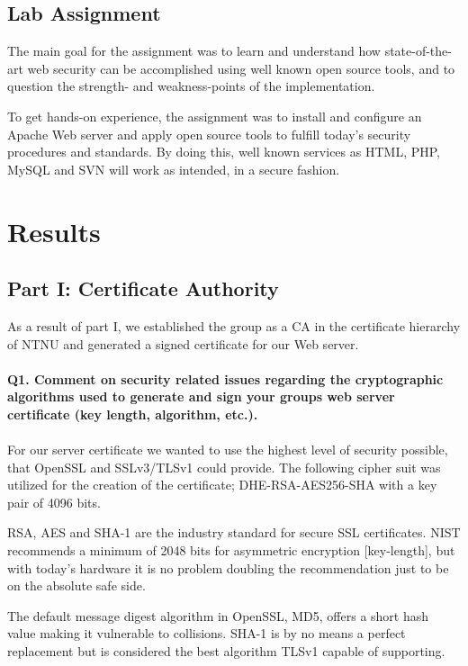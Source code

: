 \documentclass[a4paper, 12pt]{article}
\begin{document}
\subsection{Lab Assignment}
The main goal for the assignment was to learn and understand how state-of-the-art web security can be accomplished using well known open source tools, and to question the strength- and weakness-points of the implementation.

To get hands-on experience, the assignment was to install and configure an Apache Web server and apply open source tools to fulfill today’s security procedures and standards. By doing this, well known services as HTML, PHP, MySQL and SVN will work as intended, in a secure fashion.


\section{Results}

\subsection{Part I: Certificate Authority}
As a result of part I, we established the group as a CA in the certificate hierarchy of NTNU and generated a signed certificate for our Web server. \\ \\
{\bf Q1. Comment on security related issues regarding the cryptographic algorithms used to
generate and sign your groups web server certificate (key length, algorithm, etc.).}
\\ \\
For our server certificate we wanted to use the highest level of security possible, that OpenSSL and SSLv3/TLSv1 could provide. The following cipher suit was utilized for the creation of the certificate; DHE-RSA-AES256-SHA with a key pair of 4096 bits.

RSA, AES and SHA-1 are the industry standard for secure SSL certificates. NIST recommends a minimum of 2048 bits\cite{nistkey} for asymmetric encryption [key-length], but with today's hardware it is no problem doubling the recommendation just to be on the absolute safe side.

The default message digest algorithm in OpenSSL, MD5, offers a short hash value making it vulnerable to collisions. SHA-1 is by no means a perfect replacement but is considered the best algorithm TLSv1 capable of supporting. 
\end{document}
